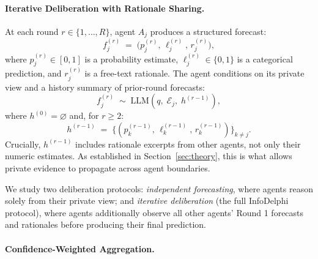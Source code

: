 \documentclass[11pt]{article}
\theoremstyle{plain}
\theoremstyle{definition}
\newcommand{\Eview}[1]{\mathcal{E}_{#1}}
\begin{document}
\paragraph{Iterative Deliberation with Rationale Sharing.}
  \label{sec:deliberation}
 
  At each round $r \in \{1, \dots, R\}$, agent $A_j$ produces a structured forecast:
  \begin{equation}
    f_j^{(r)} \;=\; \bigl(p_j^{(r)},\, \ell_j^{(r)},\, r_j^{(r)}\bigr),
  \end{equation}
  where $p_j^{(r)} \in [0,1]$ is a probability estimate, $\ell_j^{(r)} \in \{0,1\}$ is a categorical prediction, and $r_j^{(r)}$ is a free-text
  rationale.
  The agent conditions on its private view and a history summary of prior-round forecasts:
  \begin{equation}
    f_j^{(r)} \;\sim\; \mathrm{LLM}\!\left(q,\;\Eview{j},\;h^{(r-1)}\right),
    \label{eq:agent}
  \end{equation}
  where $h^{(0)} = \varnothing$ and, for $r \geq 2$:
  \begin{equation}
    h^{(r-1)} \;=\; \bigl\{(p_k^{(r-1)},\,\ell_k^{(r-1)},\,r_k^{(r-1)})\bigr\}_{k \neq j}.
    \label{eq:history}
  \end{equation}
  Crucially, $h^{(r-1)}$ includes rationale excerpts from other agents, not only their numeric estimates.
  As established in Section~\ref{sec:theory}, this is what allows private evidence to propagate across agent boundaries.

  We study two deliberation protocols: \textit{independent forecasting},
  where agents reason solely from their private view; and \textit{iterative deliberation} (the full InfoDelphi protocol), where agents additionally
  observe all other agents' Round 1 forecasts and rationales before producing their final prediction.
  
  \paragraph{Confidence-Weighted Aggregation.}
  \label{sec:aggregation}
\end{document}
